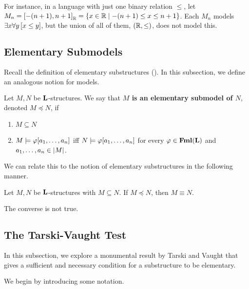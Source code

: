 For instance, in a language with just one binary relation $\leq$, let $M_n = \left[ -(n + 1), n + 1 \right]_{\mathbb{R}} = \left\{ x \in \mathbb{R} \; \middle\vert \; -(n + 1) \leq x \leq n + 1 \right\}$. Each $M_n$ models $\exists x \forall y \left[ x \leq y \right]$, but the union of all of them, $(\mathbb{R}, \leq)$, does not model this.

\subsection{Elementary Submodels}

Recall the definition of elementary substructures (\sorry). In this subsection, we define an analogous notion for models.

\begin{boxdefinition}
    Let $M, N$ be $\mathbf{L}$-structures. We say that \textbf{$M$ is an elementary submodel of $N$}, denoted $M \preceq N$, if
    \begin{enumerate}
        \item $M \subseteq N$
        \item $M \models \varphi\!\left[ a_1, \ldots, a_n \right]$ iff $N \models \varphi\!\left[ a_1, \ldots, a_n \right]$ for every $\varphi \in \mathbf{Fml}\!\left( \mathbf{L} \right)$ and $a_1, \ldots, a_n \in \left\lvert M \right\rvert$.
    \end{enumerate}
\end{boxdefinition}

We can relate this to the notion of elementary substructures in the following manner.

\begin{boxtheorem}
    Let $M, N$ be $\mathbf{L}$-structures with $M \subseteq N$. If $M \preceq N$, then $M \equiv N$.
\end{boxtheorem}

The converse is not true.

\begin{boxcexample}
    \sorry
\end{boxcexample}

\subsection{The Tarski-Vaught Test}

In this subsection, we explore a monumental result by Tarski and Vaught that gives a sufficient and necessary condition for a substructure to be elementary.

We begin by introducing some notation.

